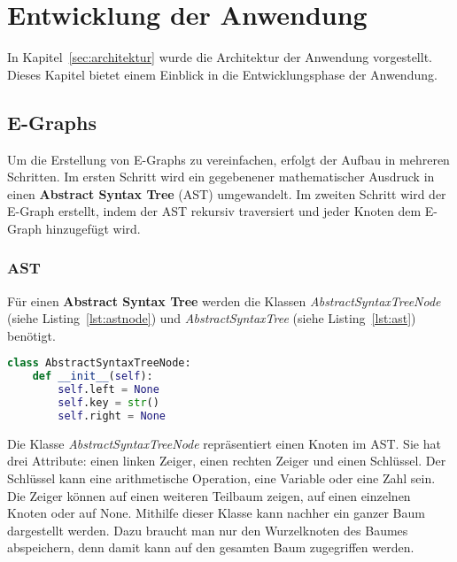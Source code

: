 \section{Entwicklung der Anwendung}\label{sec:entwicklung}

In Kapitel~\ref{sec:architektur} wurde die Architektur der Anwendung vorgestellt. Dieses Kapitel bietet einem Einblick in die Entwicklungsphase
der Anwendung.

\subsection{E-Graphs}

Um die Erstellung von E-Graphs zu vereinfachen, erfolgt der Aufbau in mehreren Schritten.
Im ersten Schritt wird ein gegebenener mathematischer Ausdruck in einen \textbf{Abstract Syntax Tree} (AST) umgewandelt.
Im zweiten Schritt wird der E-Graph erstellt, indem der AST rekursiv traversiert und jeder Knoten dem E-Graph hinzugefügt wird. 

\subsubsection{AST}

Für einen \textbf{Abstract Syntax Tree} werden die Klassen \textit{AbstractSyntaxTreeNode} (siehe Listing~\ref{lst:astnode}) und 
\textit{AbstractSyntaxTree} (siehe Listing~\ref{lst:ast}) benötigt.



\begin{lstlisting}[language=Python, caption=Klasse \textit{AbstractSyntaxTreeNode}, label={lst:astnode}]
class AbstractSyntaxTreeNode:
    def __init__(self):
        self.left = None
        self.key = str()
        self.right = None
\end{lstlisting}

Die Klasse \textit{AbstractSyntaxTreeNode} repräsentiert einen Knoten im AST. Sie hat drei Attribute: einen linken Zeiger, einen rechten Zeiger
und einen Schlüssel. Der Schlüssel kann eine arithmetische Operation, eine Variable oder eine Zahl sein. Die Zeiger können auf einen weiteren Teilbaum zeigen, auf einen einzelnen Knoten
oder auf None. Mithilfe dieser Klasse kann nachher ein ganzer Baum dargestellt werden. Dazu braucht man nur den Wurzelknoten des Baumes abspeichern, denn damit
kann auf den gesamten Baum zugegriffen werden. 

